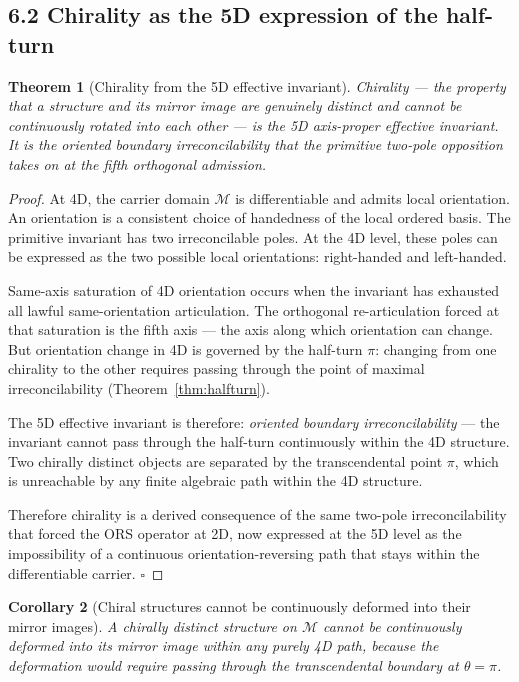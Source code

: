 \documentclass[11pt]{article}
\newtheorem{theorem}{Theorem}[section]
\newtheorem{corollary}[theorem]{Corollary}
\theoremstyle{definition}
\theoremstyle{remark}
\begin{document}
\subsection{6.2 Chirality as the 5D expression of the half-turn}

\begin{theorem}[Chirality from the 5D effective invariant]\label{thm:chirality}
Chirality --- the property that a structure and its mirror image are
genuinely distinct and cannot be continuously rotated into each other
--- is the 5D axis-proper effective invariant. It is the oriented
boundary irreconcilability that the primitive two-pole opposition takes
on at the fifth orthogonal admission.
\end{theorem}

\begin{proof}
At 4D, the carrier domain $\mathcal{M}$ is differentiable and admits
local orientation. An orientation is a consistent choice of handedness
of the local ordered basis. The primitive invariant has two irreconcilable
poles. At the 4D level, these poles can be expressed as the two possible
local orientations: right-handed and left-handed.

Same-axis saturation of 4D orientation occurs when the invariant has
exhausted all lawful same-orientation articulation. The orthogonal
re-articulation forced at that saturation is the fifth axis --- the axis
along which orientation can change. But orientation change in 4D is
governed by the half-turn $\pi$: changing from one chirality to the
other requires passing through the point of maximal
irreconcilability (Theorem~\ref{thm:halfturn}).

The 5D effective invariant is therefore: \emph{oriented boundary
irreconcilability} --- the invariant cannot pass through the half-turn
continuously within the 4D structure. Two chirally distinct objects are
separated by the transcendental point $\pi$, which is unreachable by
any finite algebraic path within the 4D structure.

Therefore chirality is a derived consequence of the same two-pole
irreconcilability that forced the ORS operator at 2D, now expressed at
the 5D level as the impossibility of a continuous orientation-reversing
path that stays within the differentiable carrier. $\square$
\end{proof}

\begin{corollary}[Chiral structures cannot be continuously deformed
into their mirror images]
A chirally distinct structure on $\mathcal{M}$ cannot be continuously
deformed into its mirror image within any purely 4D path, because the
deformation would require passing through the transcendental boundary
at $\theta=\pi$.
\end{corollary}
\end{document}
